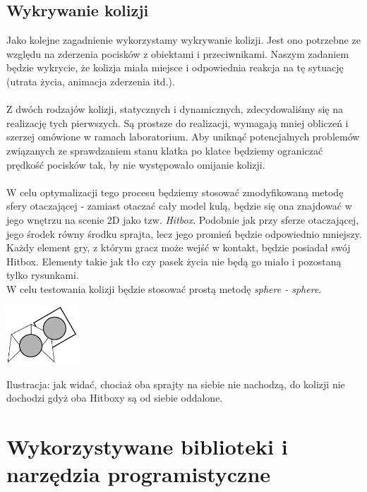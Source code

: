 \documentclass[a4paper,twoside]{article}
\begin{document}
	\subsection{Wykrywanie kolizji}
	Jako kolejne zagadnienie wykorzystamy wykrywanie kolizji. Jest ono potrzebne ze względu na zderzenia pocisków z obiektami i przeciwnikami. Naszym zadaniem będzie wykrycie, że kolizja miała miejsce i odpowiednia reakcja na tę sytuację (utrata życia, animacja zderzenia itd.).\\\\
	Z dwóch rodzajów kolizji, statycznych i dynamicznych, zdecydowaliśmy się na realizację tych pierwszych. Są prostsze do realizacji, wymagają mniej obliczeń i szerzej omówione w ramach laboratorium. Aby uniknąć potencjalnych problemów związanych ze sprawdzaniem stanu klatka po klatce będziemy ograniczać prędkość pocisków tak, by nie występowało omijanie kolizji.\\\\
	W celu optymalizacji tego procesu będziemy stosować zmodyfikowaną metodę sfery otaczającej - zamiast otaczać cały model kulą, będzie się ona znajdować w jego wnętrzu na scenie 2D jako tzw. \emph{Hitbox}. Podobnie jak przy sferze otaczającej, jego środek równy środku sprajta, lecz jego promień będzie odpowiednio mniejszy. Każdy element gry, z którym gracz może wejść w kontakt, będzie posiadał swój Hitbox. Elementy takie jak tło czy pasek życia nie będą go miało i pozostaną tylko rysunkami.\\
	W celu testowania kolizji będzie stosować prostą metodę \emph{sphere - sphere}.
	
	\begin{center}
		\includegraphics[width=0.2\textwidth]{./images/kolizja}
	\end{center}
	Ilustracja: jak widać, chociaż oba sprajty na siebie nie nachodzą, do kolizji nie dochodzi gdyż oba Hitboxy są od siebie oddalone.\\
	
	\section{Wykorzystywane biblioteki i narzędzia programistyczne}
\end{document}
